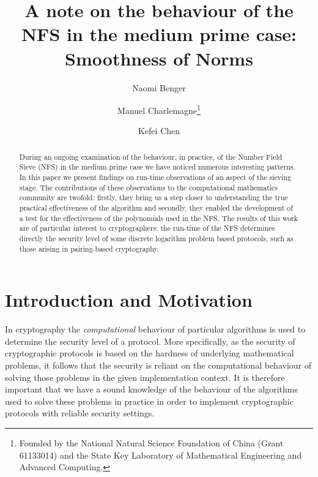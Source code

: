 \documentclass[a4paper, 12pt, envcountsect, runningheads]{llncs}
\numberwithin{figure}{section}
\numberwithin{equation}{section}
\begin{document}
\title{A note on the behaviour of the NFS in the medium prime case: Smoothness of Norms}

\author{Naomi Benger
\and Manuel Charlemagne\thanks{Founded by the National Natural Science Foundation of China (Grant 61133014) and the State Key Laboratory of Mathematical Engineering and Advanced Computing.}
\and Kefei Chen}

\maketitle
\begin{abstract}
During an ongoing examination of the behaviour, in practice, of the Number Field Sieve (NFS) in the medium prime case we have noticed numerous interesting patterns. In this paper we present findings on run-time observations of an aspect of the sieving stage. The contributions of these observations to the computational mathematics community are twofold: firstly, they bring us a step closer to understanding the true practical effectiveness of the algorithm and secondly, they enabled the development of a test for the effectiveness of the polynomials used in the NFS. The results of this work are of particular interest to cryptographers: the run-time of the NFS determines directly the security level of some discrete logarithm problem based protocols, such as those arising in pairing-based cryptography.
\end{abstract}
\section{Introduction and Motivation}
In cryptography the {\em computational} behaviour of particular algorithms is used to determine the security level of a protocol. More specifically, as the security of cryptographic protocols is based on the hardness of underlying mathematical problems, it follows that the security is reliant on the computational behaviour of solving those problems in the given implementation context. It is therefore important that we have a sound knowledge of the behaviour of the algorithms used to solve these problems in practice in order to implement cryptographic protocols with reliable security settings.
\end{document}
